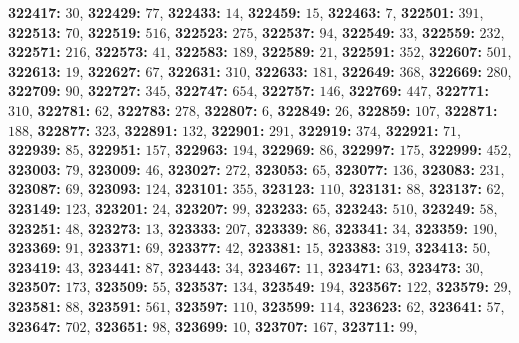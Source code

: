 \textsf{\bfseries 322417:} $30$, \textsf{\bfseries 322429:} $77$, \textsf{\bfseries 322433:} $14$, \textsf{\bfseries 322459:} $15$, \textsf{\bfseries 322463:} $7$, \textsf{\bfseries 322501:} $391$, \textsf{\bfseries 322513:} $70$, \textsf{\bfseries 322519:} $516$, \textsf{\bfseries 322523:} $275$, \textsf{\bfseries 322537:} $94$, \textsf{\bfseries 322549:} $33$, \textsf{\bfseries 322559:} $232$, \textsf{\bfseries 322571:} $216$, \textsf{\bfseries 322573:} $41$, \textsf{\bfseries 322583:} $189$, \textsf{\bfseries 322589:} $21$, \textsf{\bfseries 322591:} $352$, \textsf{\bfseries 322607:} $501$, \textsf{\bfseries 322613:} $19$, \textsf{\bfseries 322627:} $67$, \textsf{\bfseries 322631:} $310$, \textsf{\bfseries 322633:} $181$, \textsf{\bfseries 322649:} $368$, \textsf{\bfseries 322669:} $280$, \textsf{\bfseries 322709:} $90$, \textsf{\bfseries 322727:} $345$, \textsf{\bfseries 322747:} $654$, \textsf{\bfseries 322757:} $146$, \textsf{\bfseries 322769:} $447$, \textsf{\bfseries 322771:} $310$, \textsf{\bfseries 322781:} $62$, \textsf{\bfseries 322783:} $278$, \textsf{\bfseries 322807:} $6$, \textsf{\bfseries 322849:} $26$, \textsf{\bfseries 322859:} $107$, \textsf{\bfseries 322871:} $188$, \textsf{\bfseries 322877:} $323$, \textsf{\bfseries 322891:} $132$, \textsf{\bfseries 322901:} $291$, \textsf{\bfseries 322919:} $374$, \textsf{\bfseries 322921:} $71$, \textsf{\bfseries 322939:} $85$, \textsf{\bfseries 322951:} $157$, \textsf{\bfseries 322963:} $194$, \textsf{\bfseries 322969:} $86$, \textsf{\bfseries 322997:} $175$, \textsf{\bfseries 322999:} $452$, \textsf{\bfseries 323003:} $79$, \textsf{\bfseries 323009:} $46$, \textsf{\bfseries 323027:} $272$, \textsf{\bfseries 323053:} $65$, \textsf{\bfseries 323077:} $136$, \textsf{\bfseries 323083:} $231$, \textsf{\bfseries 323087:} $69$, \textsf{\bfseries 323093:} $124$, \textsf{\bfseries 323101:} $355$, \textsf{\bfseries 323123:} $110$, \textsf{\bfseries 323131:} $88$, \textsf{\bfseries 323137:} $62$, \textsf{\bfseries 323149:} $123$, \textsf{\bfseries 323201:} $24$, \textsf{\bfseries 323207:} $99$, \textsf{\bfseries 323233:} $65$, \textsf{\bfseries 323243:} $510$, \textsf{\bfseries 323249:} $58$, \textsf{\bfseries 323251:} $48$, \textsf{\bfseries 323273:} $13$, \textsf{\bfseries 323333:} $207$, \textsf{\bfseries 323339:} $86$, \textsf{\bfseries 323341:} $34$, \textsf{\bfseries 323359:} $190$, \textsf{\bfseries 323369:} $91$, \textsf{\bfseries 323371:} $69$, \textsf{\bfseries 323377:} $42$, \textsf{\bfseries 323381:} $15$, \textsf{\bfseries 323383:} $319$, \textsf{\bfseries 323413:} $50$, \textsf{\bfseries 323419:} $43$, \textsf{\bfseries 323441:} $87$, \textsf{\bfseries 323443:} $34$, \textsf{\bfseries 323467:} $11$, \textsf{\bfseries 323471:} $63$, \textsf{\bfseries 323473:} $30$, \textsf{\bfseries 323507:} $173$, \textsf{\bfseries 323509:} $55$, \textsf{\bfseries 323537:} $134$, \textsf{\bfseries 323549:} $194$, \textsf{\bfseries 323567:} $122$, \textsf{\bfseries 323579:} $29$, \textsf{\bfseries 323581:} $88$, \textsf{\bfseries 323591:} $561$, \textsf{\bfseries 323597:} $110$, \textsf{\bfseries 323599:} $114$, \textsf{\bfseries 323623:} $62$, \textsf{\bfseries 323641:} $57$, \textsf{\bfseries 323647:} $702$, \textsf{\bfseries 323651:} $98$, \textsf{\bfseries 323699:} $10$, \textsf{\bfseries 323707:} $167$, \textsf{\bfseries 323711:} $99$, 
